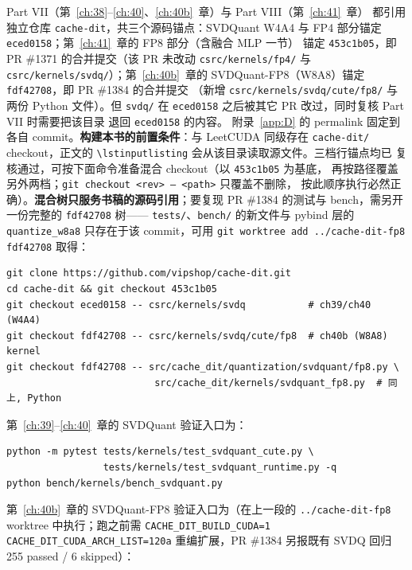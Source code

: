 Part VII（第~\ref{ch:38}--\ref{ch:40}、\ref{ch:40b}~章）与 Part VIII（第~\ref{ch:41}~章）
都引用独立仓库 \texttt{cache-dit}，共三个源码锚点：SVDQuant W4A4 与 FP4
部分锚定 \texttt{eced0158}；第~\ref{ch:41}~章的 FP8 部分（含融合 MLP 一节）
锚定 \texttt{453c1b05}，即 PR \#1371 的合并提交（该 PR 未改动
\texttt{csrc/kernels/fp4/} 与 \texttt{csrc/kernels/svdq/}）；第~\ref{ch:40b}~章的
SVDQuant-FP8（W8A8）锚定 \texttt{fdf42708}，即 PR \#1384 的合并提交
（新增 \texttt{csrc/kernels/svdq/cute/fp8/} 与两份 Python 文件）。但 \texttt{svdq/}
在 \texttt{eced0158} 之后被其它 PR 改过，同时复核 Part VII 时需要把该目录
退回 \texttt{eced0158} 的内容。
附录~\ref{app:D} 的 permalink 固定到各自 commit。\textbf{构建本书的前置条件}：与 LeetCUDA 同级存在
\texttt{cache-dit/} checkout，正文的
\texttt{\textbackslash lstinputlisting} 会从该目录读取源文件。三档行锚点均已
复核通过，可按下面命令准备混合 checkout（以 \texttt{453c1b05} 为基底，
再按路径覆盖另外两档；\texttt{git checkout <rev> -- <path>} 只覆盖不删除，
按此顺序执行必然正确）。\textbf{混合树只服务书稿的源码引用}；要复现
PR \#1384 的测试与 bench，需另开一份完整的 \texttt{fdf42708} 树——
\texttt{tests/}、\texttt{bench/} 的新文件与 pybind 层的
\texttt{quantize\_w8a8} 只存在于该 commit，可用
\texttt{git worktree add ../cache-dit-fp8 fdf42708} 取得：

\begin{lstlisting}[style=console]
git clone https://github.com/vipshop/cache-dit.git
cd cache-dit && git checkout 453c1b05
git checkout eced0158 -- csrc/kernels/svdq           # ch39/ch40 (W4A4)
git checkout fdf42708 -- csrc/kernels/svdq/cute/fp8  # ch40b (W8A8) kernel
git checkout fdf42708 -- src/cache_dit/quantization/svdquant/fp8.py \
                          src/cache_dit/kernels/svdquant_fp8.py  # 同上, Python
\end{lstlisting}

\noindent 第~\ref{ch:39}--\ref{ch:40}~章的 SVDQuant 验证入口为：

\begin{lstlisting}[style=console]
python -m pytest tests/kernels/test_svdquant_cute.py \
                 tests/kernels/test_svdquant_runtime.py -q
python bench/kernels/bench_svdquant.py
\end{lstlisting}

\noindent 第~\ref{ch:40b}~章的 SVDQuant-FP8 验证入口为（在上一段的
\texttt{../cache-dit-fp8} worktree 中执行；跑之前需
\texttt{CACHE\_DIT\_BUILD\_CUDA=1 CACHE\_DIT\_CUDA\_ARCH\_LIST=120a}
重编扩展，PR \#1384 另报既有 SVDQ 回归 255 passed / 6 skipped）：

